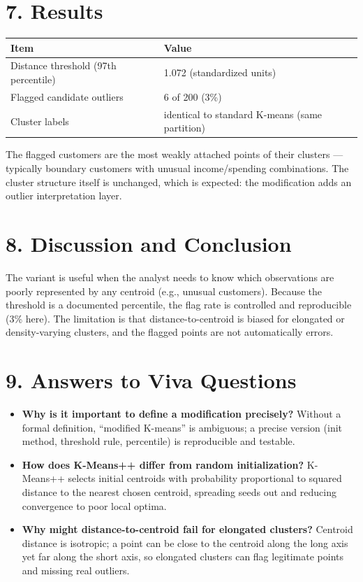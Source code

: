 \section{7. Results}\label{results}

{\def\LTcaptype{none} %
\begin{longtable}[]{@{}ll@{}}
\toprule\noalign{}
Item & Value \\
\midrule\noalign{}
\endhead
\bottomrule\noalign{}
\endlastfoot
Distance threshold (97th percentile) & 1.072 (standardized units) \\
Flagged candidate outliers & 6 of 200 (3\%) \\
Cluster labels & identical to standard K-means (same partition) \\
\end{longtable}
}

The flagged customers are the most weakly attached points of their
clusters --- typically boundary customers with unusual income/spending
combinations. The cluster structure itself is unchanged, which is
expected: the modification adds an outlier interpretation layer.

\section{8. Discussion and Conclusion}\label{discussion-and-conclusion}

The variant is useful when the analyst needs to know which observations
are poorly represented by any centroid (e.g., unusual customers).
Because the threshold is a documented percentile, the flag rate is
controlled and reproducible (3\% here). The limitation is that
distance-to-centroid is biased for elongated or density-varying
clusters, and the flagged points are not automatically errors.

\section{9. Answers to Viva Questions}\label{answers-to-viva-questions}

\begin{itemize}
\tightlist
\item
  \textbf{Why is it important to define a modification precisely?}
  Without a formal definition, ``modified K-means'' is ambiguous; a
  precise version (init method, threshold rule, percentile) is
  reproducible and testable.
\item
  \textbf{How does K-Means++ differ from random initialization?}
  K-Means++ selects initial centroids with probability proportional to
  squared distance to the nearest chosen centroid, spreading seeds out
  and reducing convergence to poor local optima.
\item
  \textbf{Why might distance-to-centroid fail for elongated clusters?}
  Centroid distance is isotropic; a point can be close to the centroid
  along the long axis yet far along the short axis, so elongated
  clusters can flag legitimate points and missing real outliers.
\end{itemize}


